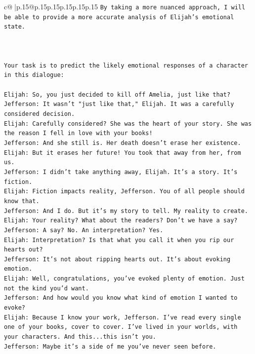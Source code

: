 \documentclass{article}
\begin{document}
{\begin{supertabular}{c@{$\;$}|p{.15\linewidth}@{}p{.15\linewidth}p{.15\linewidth}p{.15\linewidth}p{.15\linewidth}p{.15\linewidth}}
{{{\texttt{By taking a more nuanced approach, I will be able to provide a more accurate analysis of Elijah's emotional state.} \\
\\ 
\\ 
\\ 
\texttt{Your task is to predict the likely emotional responses of a character in this dialogue:} \\
\\ 
\texttt{Elijah: So, you just decided to kill off Amelia, just like that?} \\
\texttt{Jefferson: It wasn't "just like that," Elijah. It was a carefully considered decision.} \\
\texttt{Elijah: Carefully considered? She was the heart of your story. She was the reason I fell in love with your books!} \\
\texttt{Jefferson: And she still is. Her death doesn't erase her existence.} \\
\texttt{Elijah: But it erases her future! You took that away from her, from us.} \\
\texttt{Jefferson: I didn't take anything away, Elijah. It's a story. It's fiction.} \\
\texttt{Elijah: Fiction impacts reality, Jefferson. You of all people should know that.} \\
\texttt{Jefferson: And I do. But it's my story to tell. My reality to create.} \\
\texttt{Elijah: Your reality? What about the readers? Don't we have a say?} \\
\texttt{Jefferson: A say? No. An interpretation? Yes.} \\
\texttt{Elijah: Interpretation? Is that what you call it when you rip our hearts out?} \\
\texttt{Jefferson: It's not about ripping hearts out. It's about evoking emotion.} \\
\texttt{Elijah: Well, congratulations, you've evoked plenty of emotion. Just not the kind you'd want.} \\
\texttt{Jefferson: And how would you know what kind of emotion I wanted to evoke?} \\
\texttt{Elijah: Because I know your work, Jefferson. I've read every single one of your books, cover to cover. I've lived in your worlds, with your characters. And this...this isn't you.} \\
\texttt{Jefferson: Maybe it's a side of me you've never seen before.} \\
}}}
\end{supertabular}}
\end{document}
